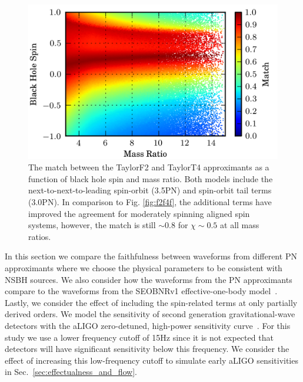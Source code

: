 \begin{figure}
\includegraphics{papers/nsbh_faithfulness/figure3.png}

\caption{\label{fig:f2t4fso}The match between the TaylorF2 and TaylorT4 approximants
as a function of black hole spin and mass ratio. Both models include
the next-to-next-to-leading spin-orbit (3.5\ac{PN}) and spin-orbit tail 
terms (3.0\ac{PN}). In comparison to Fig. \ref{fig:f2f4f}, the additional terms have 
improved the agreement for moderately spinning aligned spin systems, however, the
match is still $ \sim 0.8 $ for $\chi \sim 0.5 $ at all mass ratios.}

\end{figure}



In this section we compare the faithfulness between waveforms from different
\ac{PN} approximants where we choose the physical parameters to be consistent
with \ac{NSBH} sources.  We also consider how the waveforms from the \ac{PN}
approximants compare to the waveforms from the SEOBNRv1 effective-one-body
model~\cite{Taracchini:2012ig}. Lastly, we consider the effect of including 
the spin-related terms at only partially derived orders. 
We model the sensitivity of second generation  gravitational-wave detectors with the aLIGO
zero-detuned, high-power sensitivity curve~\cite{aLIGOSensCurves}. For this
study we use a lower frequency cutoff of 15Hz since it is not expected that
detectors will have significant sensitivity below this frequency. We consider
the effect of increasing this low-frequency cutoff to simulate early aLIGO
sensitivities in Sec.~\ref{sec:effectualness_and_flow}.

